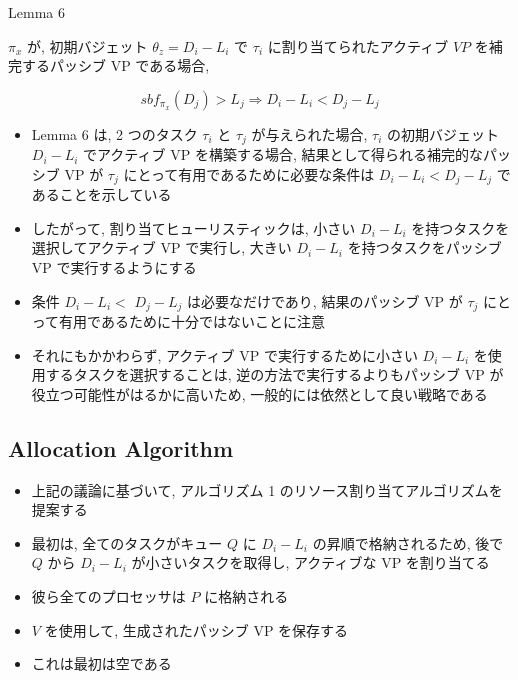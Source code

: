 \begin{frame}[label=lemma6]{Lemma 6}
    \begin{lemma}[]
        $\pi_{x}$ が, 初期バジェット $\theta_{z}=D_{i}-L_{i}$ で $\tau_{i}$ に割り当てられたアクティブ $V P$ を補完するパッシブ VP である場合,

        \begin{equation*}
            s b f_{\pi_{x}}\left(D_{j}\right)>L_{j} \Rightarrow D_{i}-L_{i}<D_{j}-L_{j}
        \end{equation*}
    \end{lemma}
\end{frame}

\begin{frame}{}
    \begin{itemize}
        \item Lemma 6 は, 2 つのタスク $\tau_{i}$ と $\tau_{j}$ が与えられた場合, $\tau_{i}$ の初期バジェット $D_{i}-L_{i}$ でアクティブ VP を構築する場合, 結果として得られる補完的なパッシブ VP が $\tau_{j}$ にとって有用であるために必要な条件は $D_{i}-L_{i}<D_{j}-L_{j}$ であることを示している
\item したがって, 割り当てヒューリスティックは, 小さい $D_{i}-L_{i}$ を持つタスクを選択してアクティブ VP で実行し, 大きい $D_{i}-L_{i}$ を持つタスクをパッシブ VP で実行するようにする
\item 条件 $D_{i}-L_{i}<$  $D_{j}-L_{j}$ は必要なだけであり, 結果のパッシブ VP が $\tau_{j}$ にとって有用であるために十分ではないことに注意
\item それにもかかわらず, アクティブ VP で実行するために小さい $D_{i}-L_{i}$ を使用するタスクを選択することは, 逆の方法で実行するよりもパッシブ VP が役立つ可能性がはるかに高いため, 一般的には依然として良い戦略である
    \end{itemize}
\end{frame}


\subsection{Allocation Algorithm}
\label{ssec: allocation algorithm}

\begin{frame}{}
    \begin{itemize}
        \item 上記の議論に基づいて, アルゴリズム 1 のリソース割り当てアルゴリズムを提案する
\item 最初は, 全てのタスクがキュー $Q$ に $D_{i}-L_{i}$ の昇順で格納されるため, 後で $Q$ から $D_{i}-L_{i}$ が小さいタスクを取得し, アクティブな VP を割り当てる
\item 彼ら全てのプロセッサは $P$ に格納される
\item $V$ を使用して, 生成されたパッシブ VP を保存する
\item これは最初は空である
    \end{itemize}
\end{frame}

